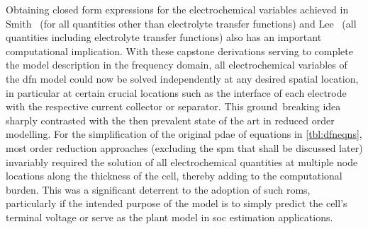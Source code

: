 Obtaining closed form expressions for  the electrochemical variables achieved in
Smith~\etal{} (for all quantities other than electrolyte transfer functions) and
Lee~\etal{} (all  quantities including electrolyte transfer  functions) also has
an important computational implication.  With these capstone derivations serving
to complete the  model description in the frequency  domain, all electrochemical
variables  of the  \gls{dfn}  model could  now be  solved  independently at  any
desired spatial location, in particular at certain crucial locations such as the
interface of each electrode with  the respective current collector or separator.
This ground~breaking idea sharply contrasted with the then prevalent state of the
art  in  reduced  order  modelling.  For  the  simplification  of  the  original
\gls{pdae} of  equations in \cref{tbl:dfneqns}, most  order reduction approaches
(excluding the \gls{spm} that shall  be discussed later) invariably required the
solution of all electrochemical quantities  at multiple node locations along the
thickness of  the cell, thereby adding  to the computational burden.  This was a
significant deterrent to  the adoption of such \glspl{rom},  particularly if the
intended purpose of  the model is to simply predict  the cell's terminal voltage
or serve as the plant model in \gls{soc} estimation applications.


